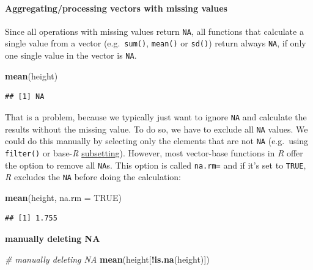\documentclass[
]{scrartcl}
\newenvironment{Shaded}{\begin{snugshade}}{\end{snugshade}}
\newcommand{\AttributeTok}[1]{\textcolor[rgb]{0.13,0.29,0.53}{#1}}
\newcommand{\CommentTok}[1]{\textcolor[rgb]{0.56,0.35,0.01}{\textit{#1}}}
\newcommand{\ConstantTok}[1]{\textcolor[rgb]{0.56,0.35,0.01}{#1}}
\newcommand{\FunctionTok}[1]{\textcolor[rgb]{0.13,0.29,0.53}{\textbf{#1}}}
\newcommand{\NormalTok}[1]{#1}
\newcommand{\SpecialCharTok}[1]{\textcolor[rgb]{0.81,0.36,0.00}{\textbf{#1}}}
\newenvironment{webexsolution}[1]
    {\par\tiny\textbf{#1}}
    {\par}
\newcommand{\webexhide}[1]{\begin{webexsolution}{#1}}
\begin{document}
\hypertarget{aggregatingprocessing-vectors-with-missing-values}{%
\paragraph*{Aggregating/processing vectors with missing values}\label{aggregatingprocessing-vectors-with-missing-values}}

Since all operations with missing values return \texttt{NA}, all functions that calculate a single value from a vector (e.g.~\texttt{sum()}, \texttt{mean()} or \texttt{sd()}) return always \texttt{NA}, if only one single value in the vector is \texttt{NA}.

\begin{Shaded}
\begin{Highlighting}[]
\FunctionTok{mean}\NormalTok{(height)}
\end{Highlighting}
\end{Shaded}

\begin{verbatim}
## [1] NA
\end{verbatim}

That is a problem, because we typically just want to ignore \texttt{NA} and calculate the results without the missing value. To do so, we have to exclude all \texttt{NA} values. We could do this manually by selecting only the elements that are not \texttt{NA} (e.g.~using \texttt{filter()} or base-\emph{R} \url{subsetting}). However, most vector-base functions in \emph{R} offer the option to remove all \texttt{NA}s. This option is called \texttt{na.rm=} and if it's set to \texttt{TRUE}, \emph{R} excludes the \texttt{NA} before doing the calculation:

\begin{Shaded}
\begin{Highlighting}[]
\FunctionTok{mean}\NormalTok{(height, }\AttributeTok{na.rm =} \ConstantTok{TRUE}\NormalTok{)}
\end{Highlighting}
\end{Shaded}

\begin{verbatim}
## [1] 1.755
\end{verbatim}

\webexhide{manually deleting NA}

\begin{Shaded}
\begin{Highlighting}[]
\CommentTok{\# manually deleting  NA}
\FunctionTok{mean}\NormalTok{(height[}\SpecialCharTok{!}\FunctionTok{is.na}\NormalTok{(height)])}
\end{Highlighting}
\end{Shaded}
\end{document}
